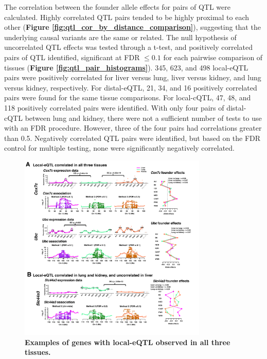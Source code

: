 The correlation between the founder allele effects for pairs of QTL were calculated. Highly correlated QTL pairs tended to be highly proximal to each other (\textbf{Figure \ref{fig:qtl_cor_by_distance_comparison}}), suggesting that the underlying causal variants are the same or related. The null hypothesis of uncorrelated QTL effects was tested through a t-test, and positively correlated pairs of QTL identified, significant at FDR $\leq 0.1$ for each pairwise comparison of tissues (\textbf{Figure \ref{fig:qtl_pair_histograms}}). 345, 623, and 498 local-eQTL pairs were positively correlated for liver versus lung, liver versus kidney, and lung versus kidney, respectively. For distal-eQTL, 21, 34, and 16 positively correlated pairs were found for the same tissue comparisons. For local-cQTL, 47, 48, and 118 positively correlated pairs were identified. With only four pairs of distal-cQTL between lung and kidney, there were not a sufficient number of tests to use with an FDR procedure. However, three of the four pairs had correlations greater than 0.5. Negatively correlated QTL pairs were identified, but based on the FDR control for multiple testing, none were significantly negatively correlated.

\begin{figure}[h]
\renewcommand{\familydefault}{\sfdefault}\normalfont
\centering
\includegraphics[width=0.8\textwidth, trim={0in 0.5in 0in 0in}, clip]{figs/correlated_local_eqtl.pdf}
\caption{\textbf{Examples of genes with local-eQTL observed in all three tissues.}\label{fig:correlated_local_eqtl}}
\end{figure}

